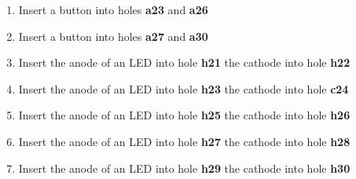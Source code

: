 \begin{enumerate}
	\item Insert a button into holes \textbf{a23} and \textbf{a26}
    \item Insert a button into holes \textbf{a27} and \textbf{a30}
	

	\item Insert the anode of an LED into hole \textbf{h21} the cathode into hole \textbf{h22}
    \item Insert the anode of an LED into hole \textbf{h23} the cathode into hole \textbf{c24}
    \item Insert the anode of an LED into hole \textbf{h25} the cathode into hole \textbf{h26}
    \item Insert the anode of an LED into hole \textbf{h27} the cathode into hole \textbf{h28}
    \item Insert the anode of an LED into hole \textbf{h29} the cathode into hole \textbf{h30}
					


\end{enumerate}
